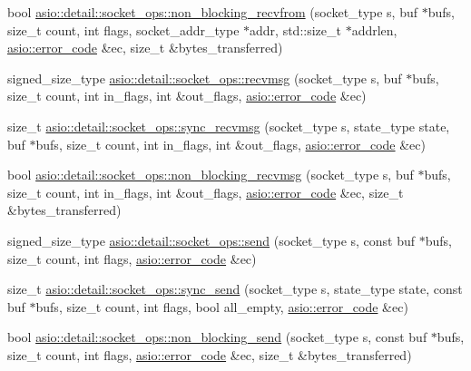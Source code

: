 \begin{DoxyCompactItemize}
\item 
bool \hyperlink{namespaceasio_1_1detail_1_1socket__ops_a5c2eb608efb11a24b249e085e2619b17}{asio\+::detail\+::socket\+\_\+ops\+::non\+\_\+blocking\+\_\+recvfrom} (socket\+\_\+type s, buf $\ast$bufs, size\+\_\+t count, int flags, socket\+\_\+addr\+\_\+type $\ast$addr, std\+::size\+\_\+t $\ast$addrlen, \hyperlink{classasio_1_1error__code}{asio\+::error\+\_\+code} \&ec, size\+\_\+t \&bytes\+\_\+transferred)
\item 
signed\+\_\+size\+\_\+type \hyperlink{namespaceasio_1_1detail_1_1socket__ops_aaf7c25a0d2a9d4458b6def014aa4d8bd}{asio\+::detail\+::socket\+\_\+ops\+::recvmsg} (socket\+\_\+type s, buf $\ast$bufs, size\+\_\+t count, int in\+\_\+flags, int \&out\+\_\+flags, \hyperlink{classasio_1_1error__code}{asio\+::error\+\_\+code} \&ec)
\item 
size\+\_\+t \hyperlink{namespaceasio_1_1detail_1_1socket__ops_ac94415889edf9890a4994d5698aca960}{asio\+::detail\+::socket\+\_\+ops\+::sync\+\_\+recvmsg} (socket\+\_\+type s, state\+\_\+type state, buf $\ast$bufs, size\+\_\+t count, int in\+\_\+flags, int \&out\+\_\+flags, \hyperlink{classasio_1_1error__code}{asio\+::error\+\_\+code} \&ec)
\item 
bool \hyperlink{namespaceasio_1_1detail_1_1socket__ops_ab3df762d0cba53842ff99cba700945ba}{asio\+::detail\+::socket\+\_\+ops\+::non\+\_\+blocking\+\_\+recvmsg} (socket\+\_\+type s, buf $\ast$bufs, size\+\_\+t count, int in\+\_\+flags, int \&out\+\_\+flags, \hyperlink{classasio_1_1error__code}{asio\+::error\+\_\+code} \&ec, size\+\_\+t \&bytes\+\_\+transferred)
\item 
signed\+\_\+size\+\_\+type \hyperlink{namespaceasio_1_1detail_1_1socket__ops_a67c061624f044ba2494011649036dbc5}{asio\+::detail\+::socket\+\_\+ops\+::send} (socket\+\_\+type s, const buf $\ast$bufs, size\+\_\+t count, int flags, \hyperlink{classasio_1_1error__code}{asio\+::error\+\_\+code} \&ec)
\item 
size\+\_\+t \hyperlink{namespaceasio_1_1detail_1_1socket__ops_a1a8b0870431e522f4c48c23107e19a9f}{asio\+::detail\+::socket\+\_\+ops\+::sync\+\_\+send} (socket\+\_\+type s, state\+\_\+type state, const buf $\ast$bufs, size\+\_\+t count, int flags, bool all\+\_\+empty, \hyperlink{classasio_1_1error__code}{asio\+::error\+\_\+code} \&ec)
\item 
bool \hyperlink{namespaceasio_1_1detail_1_1socket__ops_ac139f143014960de6e6132d4f76bfa10}{asio\+::detail\+::socket\+\_\+ops\+::non\+\_\+blocking\+\_\+send} (socket\+\_\+type s, const buf $\ast$bufs, size\+\_\+t count, int flags, \hyperlink{classasio_1_1error__code}{asio\+::error\+\_\+code} \&ec, size\+\_\+t \&bytes\+\_\+transferred)

\end{DoxyCompactItemize}
